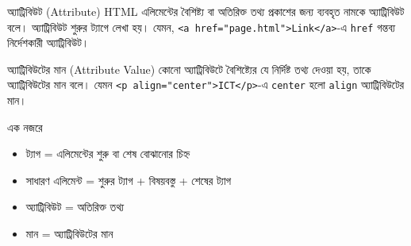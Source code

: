 \begin{definitionbox}{অ্যাট্রিবিউট (Attribute)}
HTML এলিমেন্টের বৈশিষ্ট্য বা অতিরিক্ত তথ্য প্রকাশের জন্য ব্যবহৃত নামকে অ্যাট্রিবিউট বলে। অ্যাট্রিবিউট শুরুর ট্যাগে লেখা হয়। যেমন, \texttt{<a href="page.html">Link</a>}-এ \texttt{href} গন্তব্য নির্দেশকারী অ্যাট্রিবিউট।
\end{definitionbox}

\begin{definitionbox}{অ্যাট্রিবিউটের মান (Attribute Value)}
কোনো অ্যাট্রিবিউটে বৈশিষ্ট্যের যে নির্দিষ্ট তথ্য দেওয়া হয়, তাকে অ্যাট্রিবিউটের মান বলে। যেমন \texttt{<p align="center">ICT</p>}-এ \texttt{center} হলো \texttt{align} অ্যাট্রিবিউটের মান।
\end{definitionbox}

\begin{keypointbox}{এক নজরে}
\begin{itemize}
\item ট্যাগ = এলিমেন্টের শুরু বা শেষ বোঝানোর চিহ্ন
\item সাধারণ এলিমেন্ট = শুরুর ট্যাগ + বিষয়বস্তু + শেষের ট্যাগ
\item অ্যাট্রিবিউট = অতিরিক্ত তথ্য
\item মান = অ্যাট্রিবিউটের মান
\end{itemize}
\end{keypointbox}

